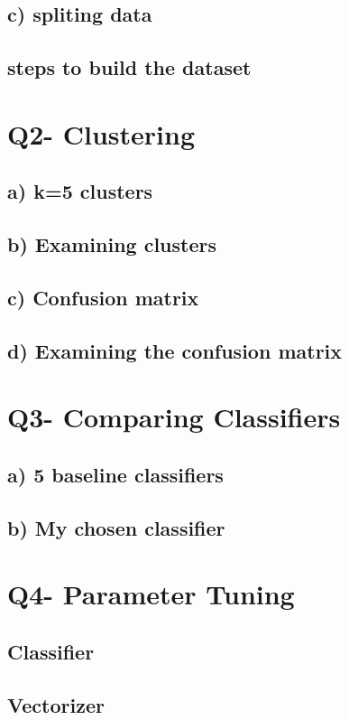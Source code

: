 \documentclass[a4paper,11pt]{article}
\begin{document}
\subsection{c) spliting data}
\subsection{steps to build the dataset}

\section{Q2- Clustering}
\subsection{a) k=5 clusters}
\subsection{b) Examining clusters}
\subsection{c) Confusion matrix}
\subsection{d) Examining the confusion matrix}



\section{Q3- Comparing Classifiers}
\subsection{a) 5 baseline classifiers}
\subsection{b) My chosen classifier}

\section{Q4- Parameter Tuning}
\subsection{Classifier}
\subsection{Vectorizer}
\end{document}
